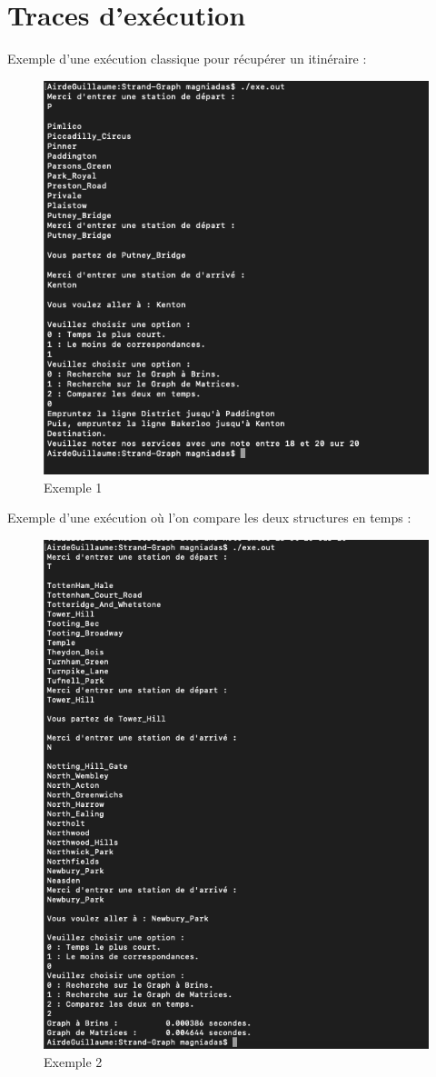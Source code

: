 \documentclass[11pt]{article}
\begin{document}
\section{Traces d'exécution}
Exemple d'une exécution classique pour récupérer un itinéraire :
\begin{figure}[htp]
\centering
\includegraphics[scale=0.6]{Trace_1.png}
\caption{Exemple 1}
\label{}
\end{figure}
\newpage
Exemple d'une exécution où l'on compare les deux structures en temps :
\begin{figure}[htp]
\centering
\includegraphics[scale=0.50]{Trace_2.png}
\caption{Exemple 2}
\label{}
\end{figure}
\end{document}
